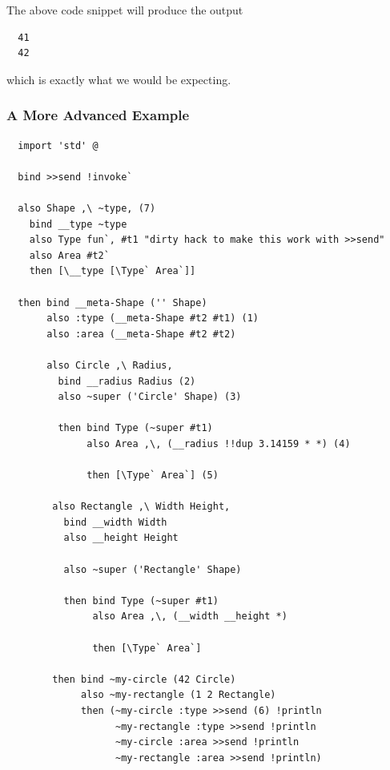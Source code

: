\documentclass{report}
\begin{document}
The above code snippet will produce the output
\begin{verbatim}
  41
  42
\end{verbatim}

which is exactly what we would be expecting.

\subsubsection{A More Advanced Example}

\begin{mdframed}[style=example]
\begin{verbatim}
  import 'std' @

  bind >>send !invoke`

  also Shape ,\ ~type, (7)
    bind __type ~type
    also Type fun`, #t1 "dirty hack to make this work with >>send"
    also Area #t2`
    then [\__type [\Type` Area`]]

  then bind __meta-Shape ('' Shape)
       also :type (__meta-Shape #t2 #t1) (1)
       also :area (__meta-Shape #t2 #t2)

       also Circle ,\ Radius,
         bind __radius Radius (2)
         also ~super ('Circle' Shape) (3)

         then bind Type (~super #t1)
              also Area ,\, (__radius !!dup 3.14159 * *) (4)

              then [\Type` Area`] (5)

        also Rectangle ,\ Width Height,
          bind __width Width
          also __height Height

          also ~super ('Rectangle' Shape)

          then bind Type (~super #t1)
               also Area ,\, (__width __height *)
  
               then [\Type` Area`]

        then bind ~my-circle (42 Circle)
             also ~my-rectangle (1 2 Rectangle)
             then (~my-circle :type >>send (6) !println
                   ~my-rectangle :type >>send !println
                   ~my-circle :area >>send !println
                   ~my-rectangle :area >>send !println)
\end{verbatim}
\end{mdframed}
\end{document}
